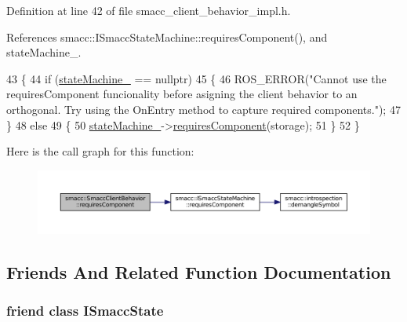 Definition at line 42 of file smacc\+\_\+client\+\_\+behavior\+\_\+impl.\+h.



References smacc\+::\+I\+Smacc\+State\+Machine\+::requires\+Component(), and state\+Machine\+\_\+.


\begin{DoxyCode}
43 \{
44     \textcolor{keywordflow}{if} (\hyperlink{classsmacc_1_1SmaccClientBehavior_a7950b5684d6de0a8e8959c0936ce9a19}{stateMachine\_} == \textcolor{keyword}{nullptr})
45     \{
46         ROS\_ERROR(\textcolor{stringliteral}{"Cannot use the requiresComponent funcionality before asigning the client behavior to an
       orthogonal. Try using the OnEntry method to capture required components."});
47     \}
48     \textcolor{keywordflow}{else}
49     \{
50         \hyperlink{classsmacc_1_1SmaccClientBehavior_a7950b5684d6de0a8e8959c0936ce9a19}{stateMachine\_}->\hyperlink{classsmacc_1_1ISmaccStateMachine_aa6b25e28f3bce24c4b356dc865a9eb7b}{requiresComponent}(storage);
51     \}
52 \}
\end{DoxyCode}


Here is the call graph for this function\+:
\nopagebreak
\begin{figure}[H]
\begin{center}
\leavevmode
\includegraphics[width=350pt]{classsmacc_1_1SmaccClientBehavior_adee6abe3a28aa6b47d3dd5267e264b4d_cgraph}
\end{center}
\end{figure}




\subsection{Friends And Related Function Documentation}
\subsubsection[{\texorpdfstring{I\+Smacc\+State}{ISmaccState}}]{\setlength{\rightskip}{0pt plus 5cm}friend class {\bf I\+Smacc\+State}\hspace{0.3cm}{\ttfamily [friend]}}\hypertarget{classsmacc_1_1SmaccClientBehavior_ab907e4cdbf326246355f56640780162e}{}\label{classsmacc_1_1SmaccClientBehavior_ab907e4cdbf326246355f56640780162e}


